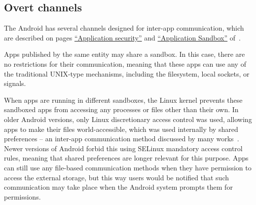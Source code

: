 \documentclass[article, oneside]{aaltoseries}
\renewcommand\gls\cgls
\begin{document}
\subsection{Overt channels}
\label{sec:overt}

The Android \gls{os} has several channels designed for inter-app communication, which are described on pages \href{https://source.android.com/security/overview/app-security}{``Application security''} and \href{https://source.android.com/security/app-sandbox}{``Application Sandbox''} of~\cite{AOSPsecurity}.

Apps published by the same entity may share a sandbox. In this case, there are no restrictions for their communication, meaning that these apps can use any of the traditional UNIX-type mechanisms, including the filesystem, local sockets, or signals.

When apps are running in different sandboxes, the Linux kernel prevents these sandboxed apps from accessing any processes or files other than their own. In older Android versions, only Linux discretionary access control was used, allowing apps to make their files world-accessible, which was used internally by shared preferences -- an inter-app communication method discussed by many works~\cite{Bhandari2017, Asavoae2017}. Newer versions of Android forbid this using SELinux mandatory access control rules, meaning that shared preferences are longer relevant for this purpose. Apps can still use any file-based communication methods when they have permission to access the external storage, but this way users would be notified that such communication may take place when the Android system prompts them for permissions.
\end{document}
